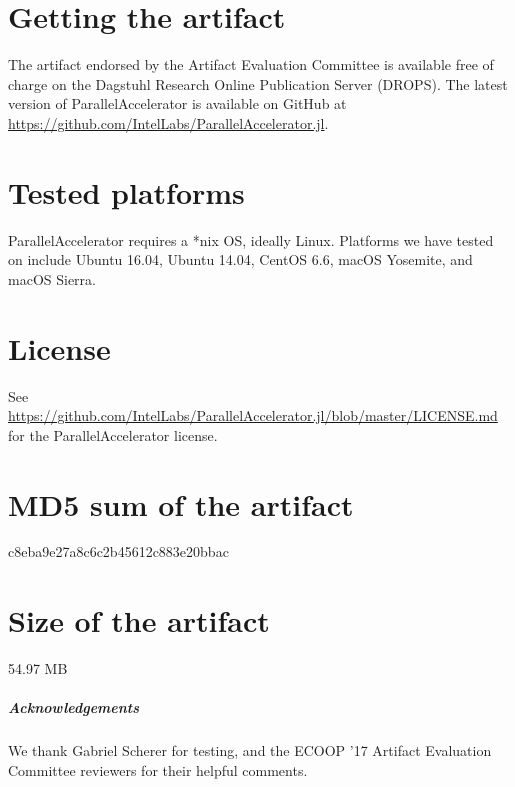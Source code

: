 \documentclass[letterpaper,USenglish]{darts}
\newenvironment{getting}{\section{Getting the artifact} The artifact 
endorsed by the Artifact Evaluation Committee is available free of 
charge on the Dagstuhl Research Online Publication Server (DROPS).}{}
\newenvironment{platforms}{\section{Tested platforms}}{}
\newcommand{\license}[1]{{\section{License}#1}}
\newcommand{\mdsum}[1]{{\section{MD5 sum of the artifact}#1}}
\newcommand{\artifactsize}[1]{{\section{Size of the artifact}#1}}
\begin{document}
\begin{getting}
  The latest version of ParallelAccelerator is available on GitHub at
  \url{https://github.com/IntelLabs/ParallelAccelerator.jl}.
\end{getting} 

\begin{platforms}
  ParallelAccelerator requires a *nix OS, ideally Linux.  Platforms we
  have tested on include Ubuntu 16.04, Ubuntu 14.04, CentOS 6.6, macOS
  Yosemite, and macOS Sierra.
\end{platforms}

\license{See
  \url{https://github.com/IntelLabs/ParallelAccelerator.jl/blob/master/LICENSE.md}
  for the ParallelAccelerator license.}

\mdsum{c8eba9e27a8c6c2b45612c883e20bbac}

\artifactsize{54.97 MB}

\subparagraph*{Acknowledgements}

We thank Gabriel Scherer for testing, and the ECOOP '17 Artifact
Evaluation Committee reviewers for their helpful comments.
\end{document}
